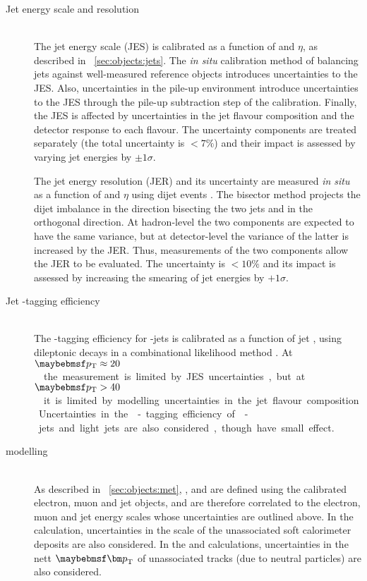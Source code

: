\begin{description}
\item[Jet energy scale and resolution] \hfill \\
	The jet energy scale (JES) is calibrated as a function of \pt and $\eta$, as described 
	in \Section~\ref{sec:objects:jets}. The \textit{in situ} calibration method of balancing 
	jets against well-measured reference objects introduces uncertainties to the JES. Also, 
	uncertainties in the pile-up environment introduce uncertainties to the JES through the 
	pile-up subtraction step of the calibration. Finally, the JES is affected by 
	uncertainties in the jet flavour composition and the detector response to each flavour.
	The uncertainty components are treated separately (the total uncertainty is $<\!7\%$) 
	and their impact is assessed by varying jet energies by $\pm1\sigma$.

	The jet energy resolution (JER) and its uncertainty are measured \textit{in situ} as a 
	function of \pt and $\eta$ using dijet events \cite{Jets:JER:2011}. The bisector method 
	projects the dijet \pt imbalance in the direction bisecting the two jets and in the 
	orthogonal direction. At hadron-level the two components are expected to have the same 
	variance, but at detector-level the variance of the latter is increased by the JER.
	Thus, measurements of the two components allow the JER to be evaluated. The uncertainty 
	is $<\!10\%$ and its impact is assessed by increasing the smearing of jet energies 
	by $+1\sigma$.

\item[Jet \Pbottom-tagging efficiency] \hfill \\
	The \Pbottom-tagging efficiency for \Pbottom-jets is calibrated as a function of jet 
	\pt, using dileptonic \ttbar decays in a combinational likelihood method \cite{Btag:llh}.
	At \unit{$\pt \approx 20$}{\GeV} the measurement is limited by JES uncertainties, but at 
	\unit{$\pt > 40$}{\GeV} it is limited by modelling uncertainties in the jet flavour 
	composition. Uncertainties in the \Pbottom-tagging efficiency of \Pcharm-jets and light 
	jets are also considered, though have small effect.

\item[\met modelling] \hfill \\
	As described in \Section~\ref{sec:objects:met}, \calomet, \trackmet and \corrtrackmet 
	are defined using the calibrated electron, muon and jet objects, and are therefore 
	correlated to the electron, muon and jet energy scales whose uncertainties are outlined 
	above. In the \calomet calculation, uncertainties in the scale of the unassociated soft 
	calorimeter deposits are also considered. In the \trackmet and \corrtrackmet 
	calculations, uncertainties in the nett $\bvec{p}_{\text{T}}$ of unassociated tracks 
	(\eg due to neutral particles) are also considered.


\end{description}
